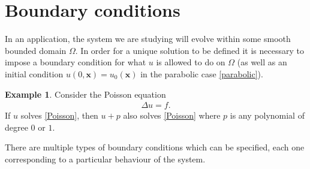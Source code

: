 \documentclass[
	a4paper,
	DIV=14,
	abstract=true,
	numbers=noenddot
]
{scrartcl}
\theoremstyle{definition}
\newtheorem{example}[theorem]{Example}
\begin{document}
\section{Boundary conditions}%
In an application, the system we are studying will evolve within some smooth bounded domain $\Omega$. In order for a unique solution to be defined it is necessary to impose a boundary condition for what $u$ is allowed to do on  $\Omega$ (as well as an initial condition $u(0,\bm{x})=u_0(\bm{x})$ in the parabolic case \eqref{parabolic}).
\begin{example}
	Consider the Poisson equation
	\begin{align}\label{Poisson}
		\Delta u=f.
	\end{align}
	If $u$ solves \eqref{Poisson}, then $u+p$ also solves \eqref{Poisson} where $p$ is any polynomial of degree  $0$ or  $1$.
\end{example}
There are multiple types of boundary conditions which can be specified, each one corresponding to a particular behaviour of the system.
\end{document}
